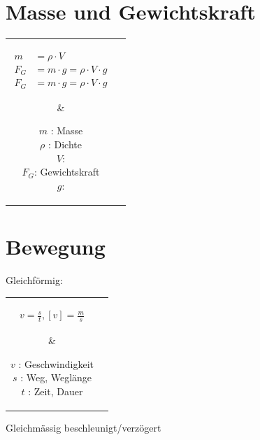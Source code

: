 
\section{Masse und Gewichtskraft}

	\begin{tabular}{cc}
	\parbox{3cm}{
		\begin{emphbox}
			\begin{align*}
				m &= \rho \cdot V \\
				F_G &= m \cdot g = \rho \cdot V \cdot g \\
				F_G &= m {\cdot} g = \rho {\cdot} V {\cdot} g
			\end{align*}
		\end{emphbox}
		} & 
	\parbox{3cm}{
		\begin{symbolbox}
			$m$ : Masse \\
			$\rho$ : Dichte \\
			$V$:  \\
			$F_G$: Gewichtskraft \\
			$g$: 
		\end{symbolbox}
	}
	\end{tabular}


\section{Bewegung}
Gleichförmig:

	\begin{tabular}{cc}
	\parbox{2.5cm}{
		\begin{emphbox}
			\begin{align*}
				v = \frac{s}{t}, [v] = \frac{m}{s}
			\end{align*}
		\end{emphbox}
	} & 
	\parbox{3.5cm}{
		\begin{symbolbox}
			$v$ : Geschwindigkeit \\
			$s$ : Weg, Weglänge \\
			$t$ : Zeit, Dauer
		\end{symbolbox}
	}
	\end{tabular}


Gleichmässig beschleunigt/verzögert

